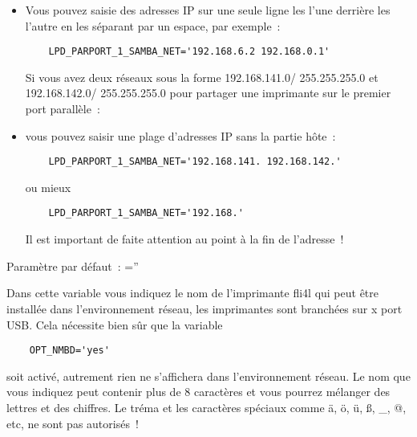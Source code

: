 \begin{description}
\begin{itemize}
\item Vous pouvez saisie des adresses IP sur une seule ligne les l'une derrière
        les l'autre en les séparant par un espace, par exemple~:

\begin{example}
\begin{verbatim}
    LPD_PARPORT_1_SAMBA_NET='192.168.6.2 192.168.0.1'
\end{verbatim}
\end{example}

    Si vous avez deux réseaux sous la forme 192.168.141.0/ 255.255.255.0 et
    192.168.142.0/ 255.255.255.0 pour partager une imprimante sur le premier
    port parallèle~:

\item vous pouvez saisir une plage d'adresses IP sans la partie hôte~:

\begin{example}
\begin{verbatim}
    LPD_PARPORT_1_SAMBA_NET='192.168.141. 192.168.142.'
\end{verbatim}
\end{example}

    ou mieux

\begin{example}
\begin{verbatim}
    LPD_PARPORT_1_SAMBA_NET='192.168.'
\end{verbatim}
\end{example}

    Il est important de faite attention au point à la fin de l'adresse~!
\end{itemize}

    Paramètre par défaut~: =''



    Dans cette variable vous indiquez le nom de l'imprimante fli4l qui peut
    être installée dans l'environnement réseau, les imprimantes sont branchées
    sur x port USB. Cela nécessite bien sûr que la variable

\begin{example}
\begin{verbatim}
    OPT_NMBD='yes'
\end{verbatim}
\end{example}

    soit activé, autrement rien ne s'affichera dans l'environnement réseau. Le
    nom que vous indiquez peut contenir plus de 8 caractères et vous pourrez
    mélanger des lettres et des chiffres. Le tréma et les caractères spéciaux
    comme ä, ö, ü, ß, \_, @, etc, ne sont pas autorisés~!


\end{description}
